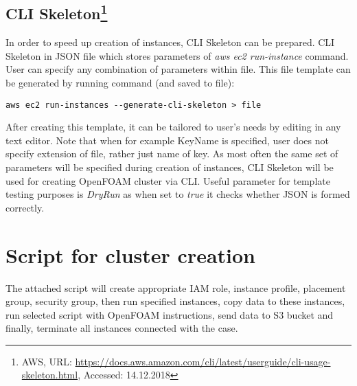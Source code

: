 \documentclass[11pt,english]{article}
\begin{document}
\subsection{CLI Skeleton\footnote{AWS, URL: \url{https://docs.aws.amazon.com/cli/latest/userguide/cli-usage-skeleton.html}, Accessed: 14.12.2018}}

In order to speed up creation of instances, CLI Skeleton can be prepared. CLI Skeleton in JSON file which stores parameters of \textit{aws ec2 run-instance} command. User can specify any combination of parameters within file. This file template can be generated by running command (and saved to file):
\begin{lstlisting}
aws ec2 run-instances --generate-cli-skeleton > file
\end{lstlisting}
After creating this template, it can be tailored to user's needs by editing in any text editor. Note that when for example KeyName is specified, user does not specify extension of file, rather just name of key. As most often the same set of parameters will be specified during creation of instances, CLI Skeleton will be used for creating OpenFOAM cluster via CLI. Useful parameter for template testing purposes is \textit{DryRun} as when set to \textit{true} it checks whether JSON is formed correctly.

\section{Script for cluster creation}

The attached script will create appropriate IAM role, instance profile, placement group, security group, then run specified instances, copy data to these instances, run selected script with OpenFOAM instructions, send data to S3 bucket and finally, terminate all instances connected with the case.
\end{document}
